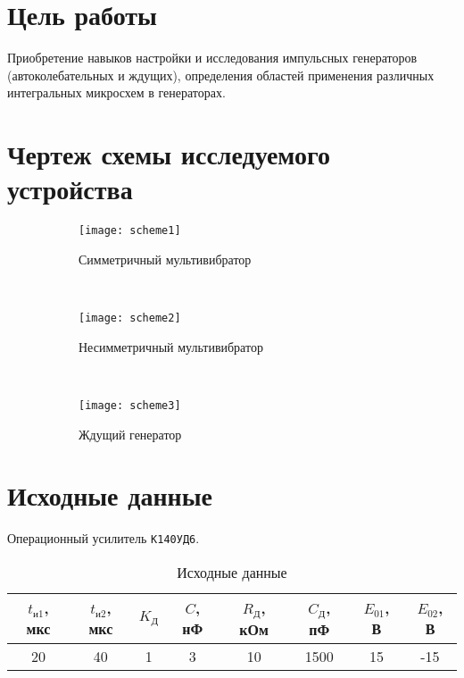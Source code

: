





\section{Цель работы}

Приобретение навыков настройки и исследования импульсных генераторов (автоколебательных и ждущих), определения областей применения различных интегральных микросхем в генераторах.

\section{Чертеж схемы исследуемого устройства}

\begin{figure}[H]
\begin{center}
	\begin{subfigure}[b]{0.35\textwidth}
		\texttt{[image: scheme1]}
		\caption{Симметричный мультивибратор}
	\end{subfigure}
	~
	\begin{subfigure}[b]{0.35\textwidth}
		\texttt{[image: scheme2]}
		\caption{Несимметричный мультивибратор}
	\end{subfigure}
	~
	\begin{subfigure}[b]{0.35\textwidth}
		\texttt{[image: scheme3]}
		\caption{Ждущий генератор}
	\end{subfigure}
	\caption{}
\end{center}
\end{figure}


\section{Исходные данные}

Операционный усилитель \verb+К140УД6+.

\begin{table}[H]
\begin{center}
	\caption{Исходные данные}
	\def\tabcolsep{10pt}
	\begin{tabular}{|c|c|c|c|c|c|c|c|}
		\hline
		$t_{\text{и1}}$, мкс &
		$t_{\text{и2}}$, мкс &
		$K_{\text{Д}}$ &
		$C$, нФ &
		$R_{\text{Д}}$, кОм &
		$C_{\text{Д}}$, пФ &
		$E_{01}$, В &
		$E_{02}$, В \\
		\hline
		20 &
		40 &
		1 &
		3 &
		10 &
		1500 &
		15 &
		-15 \\
	    \hline	
	\end{tabular}
\end{center}
\end{table}

